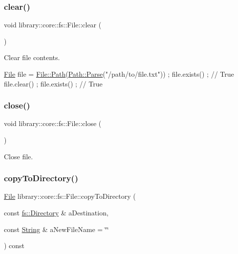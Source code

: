 \subsubsection{\texorpdfstring{clear()}{clear()}}
{\footnotesize\ttfamily void library\+::core\+::fs\+::\+File\+::clear (\begin{DoxyParamCaption}{ }\end{DoxyParamCaption})}



Clear file contents. 


\begin{DoxyCode}
\hyperlink{classlibrary_1_1core_1_1fs_1_1_file_a6f3f0d79545ac9984c6f49432f0c6c39}{File} file = \hyperlink{classlibrary_1_1core_1_1fs_1_1_file_a72d6cdf8bb7e299889c6149e2b8a6cc7}{File::Path}(\hyperlink{classlibrary_1_1core_1_1fs_1_1_path_a6ba644b6609507e724c217bf2020f5ae}{Path::Parse}(\textcolor{stringliteral}{"/path/to/file.txt"})) ;
file.exists() ; \textcolor{comment}{// True}
file.clear() ;
file.exists() ; \textcolor{comment}{// True}
\end{DoxyCode}
 \mbox{\label{classlibrary_1_1core_1_1fs_1_1_file_adf4fc7f78493f2ae10e228519ce46cf4}} 
\subsubsection{\texorpdfstring{close()}{close()}}
{\footnotesize\ttfamily void library\+::core\+::fs\+::\+File\+::close (\begin{DoxyParamCaption}{ }\end{DoxyParamCaption})}



Close file. 

\mbox{\label{classlibrary_1_1core_1_1fs_1_1_file_a9fd8a0cca72e2414f071d6045c0a1a0d}} 
\subsubsection{\texorpdfstring{copy\+To\+Directory()}{copyToDirectory()}}
{\footnotesize\ttfamily \hyperlink{classlibrary_1_1core_1_1fs_1_1_file}{File} library\+::core\+::fs\+::\+File\+::copy\+To\+Directory (\begin{DoxyParamCaption}\item[{const \hyperlink{classlibrary_1_1core_1_1fs_1_1_directory}{fs\+::\+Directory} \&}]{a\+Destination,  }\item[{const \hyperlink{classlibrary_1_1core_1_1types_1_1_string}{String} \&}]{a\+New\+File\+Name = {\ttfamily \char`\"{}\char`\"{}} }\end{DoxyParamCaption}) const}



